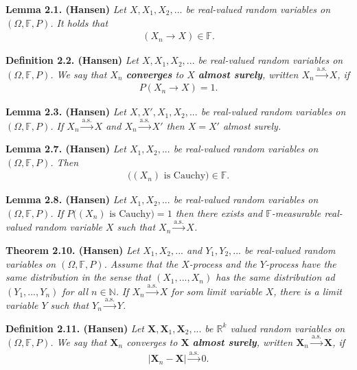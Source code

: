 \documentclass[a4paper,12pt,openany]{book}
\begin{document}
\textbf{Lemma 2.1. (Hansen)} \emph{Let \(X,X_1,X_2,...\) be real-valued random variables on \((\Omega, \mathbb{F},P)\). It holds that}
\begin{align*}
    (X_n\to X)\in \mathbb{F}.
\end{align*}

\textbf{Definition 2.2. (Hansen)} \emph{Let \(X,X_1,X_2,...\) be real-valued random variables on \((\Omega,\mathbb{F},P)\). We say that \(X_n\) \textbf{converges} to \(X\) \textbf{almost surely}, written \(X_n\stackrel{\text{a.s.}}{\to}X\), if}
\begin{align*}
    P(X_n\to X)=1.\tag{2.6}
\end{align*}

\textbf{Lemma 2.3. (Hansen)} \emph{Let \(X,X',X_1,X_2,...\) be real-valued random variables on \((\Omega,\mathbb{F},P)\). If \(X_n\stackrel{\text{a.s.}}{\to}X\) and \(X_n\stackrel{\text{a.s.}}{\to}X'\) then \(X=X'\) almost surely.}

\textbf{Lemma 2.7. (Hansen)} \emph{Let \(X_1,X_2,...\) be real-valued random variables on \((\Omega,\mathbb{F},P)\). Then}
\begin{align*}
    \Big((X_n)\text{ is Cauchy}\Big)\in \mathbb{F}.
\end{align*}

\textbf{Lemma 2.8. (Hansen)} \emph{Let \(X_1,X_2,...\) be real-valued random variables on \((\Omega,\mathbb{F},P)\). If \(P\Big((X_n)\text{ is Cauchy}\Big)=1\) then there exists and \(\mathbb{F}\)-measurable real-valued random variable \(X\) such that \(X_n\stackrel{\text{a.s.}}{\to}X\).}

\textbf{Theorem 2.10. (Hansen)} \emph{Let \(X_1,X_2,...\) and \(Y_1,Y_2,...\) be real-valued random variables on \((\Omega,\mathbb{F},P)\). Assume that the \(X\)-process and the \(Y\)-process have the same distribution in the sense that \((X_1,...,X_n)\) has the same distribution ad \((Y_1,...,Y_n)\) for all \(n\in\mathbb{N}\).}
\emph{If \(X_n\stackrel{\text{a.s.}}{\to}X\) for som limit variable \(X\), there is a limit variable \(Y\) such that \(Y_n\stackrel{\text{a.s.}}{\to}Y\).}

\textbf{Definition 2.11. (Hansen)} \emph{Let \(\mathbf{X},\mathbf{X}_1,\mathbf{X}_2,...\) be \(\mathbb{R}^k\) valued random variables on \((\Omega, \mathbb{F},P)\). We say that \(\mathbf{X}_n\) converges to \(\mathbf{X}\) \textbf{almost surely}, written \(\mathbf{X}_n\stackrel{\text{a.s.}}{\to}\mathbf{X}\), if}
\begin{align*}
    \vert\mathbf{X}_n-\mathbf{X}\vert \stackrel{\text{a.s.}}{\to} 0.\tag{2.15}
\end{align*}
\end{document}
